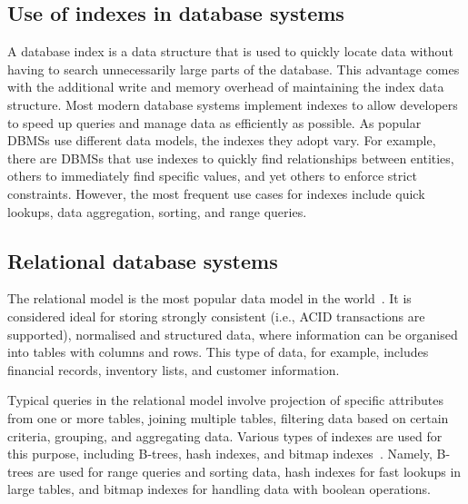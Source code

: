\subsection{Use of indexes in database systems}
A database index is a data structure that is used to quickly locate data without having to search unnecessarily large parts of the database.
This advantage comes with the additional write and memory overhead of maintaining the index data structure.
Most modern database systems implement indexes to allow developers to speed up queries and manage data as efficiently as possible.
As popular DBMSs use different data models, the indexes they adopt vary.
For example, there are DBMSs that use indexes to quickly find relationships between entities, others to immediately find specific values, and yet others to enforce strict constraints. However, the most frequent use cases for indexes include quick lookups, data aggregation, sorting, and range queries.

\subsection{Relational database systems}

The relational model is the most popular data model in the world~\citep{DBEngines2024}.
It is considered ideal for storing strongly consistent (i.e., ACID transactions are supported), normalised and structured data, where information can be organised into tables with columns and rows.
This type of data, for example, includes financial records, inventory lists, and customer information.

Typical queries in the relational model involve projection of specific attributes from one or more tables, joining multiple tables, filtering data based on certain criteria, grouping, and aggregating data. Various types of indexes are used for this purpose, including B-trees, hash indexes, and bitmap indexes~\citep{pokorny1998databazove}.
Namely, B-trees are used for range queries and sorting data, hash indexes for fast lookups in large tables, and bitmap indexes for handling data with boolean operations.

